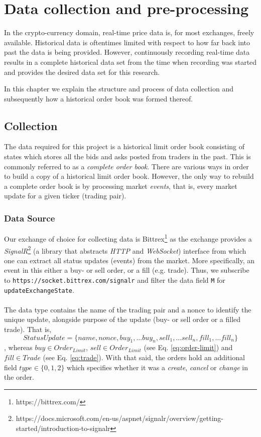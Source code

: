 \chapter{Data collection and pre-processing}
\label{chap:data}

In the crypto-currency domain, real-time price data is, for most exchanges, freely available. Historical data is oftentimes limited with respect to how far back into past the data is being provided. However, continuously recording real-time data results in a complete historical data set from the time when recording was started and provides the desired data set for this research.

In this chapter we explain the structure and process of data collection and subsequently how a historical order book was formed thereof.

\section{Collection}

The data required for this project is a historical limit order book consisting of states which stores all the bids and asks posted from traders in the past.
This is commonly referred to as a \textit{complete order book}.
There are various ways in order to build a copy of a historical limit order book. However, the only way to rebuild a complete order book is by processing market \textit{events}, that is, every market update for a given ticker (trading pair).

\subsection{Data Source}

Our exchange of choice for collecting data is Bittrex\footnote{https://bittrex.com/} as the exchange provides a \textit{SignalR}\footnote{https://docs.microsoft.com/en-us/aspnet/signalr/overview/getting-started/introduction-to-signalr} (a library that abstracts \textit{HTTP} and \textit{WebSocket}) interface from which one can extract all status updates (events) from the market.
More specifically, an event in this either a buy- or sell order, or a fill (e.g. trade).
Thus, we subscribe to \texttt{https://socket.bittrex.com/signalr} and filter the data field \texttt{M} for \texttt{updateExchangeState}.
\\
\\
The data type contains the name of the trading pair and a nonce to identify the unique update, alongside purpose of the update (buy- or sell order or a filled trade).
That is,
\begin{equation}
    StatusUpdate = \{name, nonce, buy_1,...buy_n, sell_1,...sell_n, fill_1,...fill_n\}
\end{equation}
, whereas $buy \in Order_{Limit}$, $sell \in Order_{Limit}$ (see Eq. \ref{eq:order-limit}) and $fill \in Trade$ (see Eq. \ref{eq:trade}).
With that said, the orders hold an additional field $type \in \{0,1,2\}$ which specifies whether it was a \textit{create}, \textit{cancel} or \textit{change} in the order.

